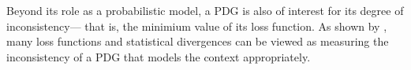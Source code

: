 %
Beyond its role as a probabilistic model,
a PDG is also of interest for its degree of inconsistency---%
that is, the minimium value of its loss function. 
As shown by 
\textcite{one-true-loss},
many loss functions and statistical divergences
can be viewed as measuring 
the inconsistency
of a PDG that models the context appropriately.
